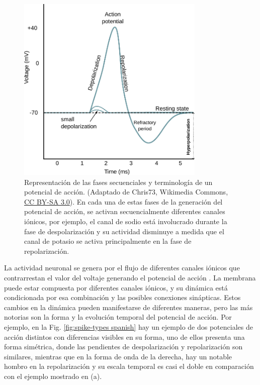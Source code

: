 \begin{figure}[htb!]
	\centering
	\includegraphics[width=0.8\textwidth]{img/intro/action_potential.pdf}
	\caption{Representación de las fases secuenciales y terminología de un potencial de acción. (Adaptado de Chris73, Wikimedia Commons, \href{https://creativecommons.org/licenses/by-sa/3.0/}{CC BY-SA 3.0}). En cada una de estas fases de la generación del potencial de acción, se activan secuencialmente diferentes canales iónicos, por ejemplo, el canal de sodio está involucrado durante la fase de despolarización y su actividad disminuye a medida que el canal de potasio se activa principalmente en la fase de repolarización.}
	\label{fig:action potential spanish}
\end{figure}

La actividad neuronal se genera por el flujo de diferentes canales iónicos que contrarrestan el valor del voltaje generando el potencial de acción \parencite{koch_biophysics_1999}. La membrana puede estar compuesta por diferentes canales iónicos, y su dinámica está condicionada por esa combinación y las posibles conexiones sinápticas. Estos cambios en la dinámica pueden manifestarse de diferentes maneras, pero las más notorias son la forma y la evolución temporal del potencial de acción. %
Por ejemplo, en la Fig. \ref{fig:spike-types spanish} hay un ejemplo de dos potenciales de acción distintos con diferencias visibles en su forma, uno de ellos presenta una forma simétrica, donde las pendientes de despolarización y repolarización son similares, mientras que en la forma de onda de la derecha, hay un notable hombro en la repolarización y su escala temporal es casi el doble en comparación con el ejemplo mostrado en (a).

